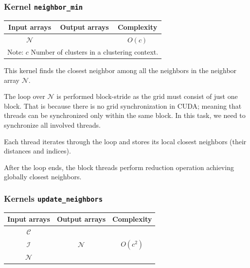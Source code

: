\subsubsection{Kernel \texttt{neighbor\_min}}

\begin{table}[h]
	\centering
	\begin{tabular}{ccc}
		\toprule
		\textbf{Input arrays} & \textbf{Output arrays} & \textbf{Complexity} \\ \midrule
		    $\mathcal{N}$     &                        &       $O(c)$        \\ \bottomrule
	    	\multicolumn{3}{l}{\footnotesize Note: $c$ Number of clusters in a clustering context.}
	\end{tabular}
\end{table}

This kernel finds the closest neighbor among all the neighbors in the neighbor array $\mathcal{N}$.

The loop over $\mathcal{N}$ is performed block-stride as the grid must consist of just one block. That is because there is no grid synchronization in CUDA; meaning that threads can be synchronized only within the same block. In this task, we need to synchronize all involved threads.

Each thread iterates through the loop and stores its local closest neighbors (their distances and indices).

After the loop ends, the block threads perform reduction operation achieving globally closest neighbors.

\subsubsection{Kernels \texttt{update\_neighbors}}

\begin{table}[h]
	\centering
	\begin{tabular}{ccc}
		\toprule
		\textbf{Input arrays} & \textbf{Output arrays} & \textbf{Complexity} \\ \midrule
		$\mathcal{C}$     &                        &                     \\
		$\mathcal{I}$     &     $\mathcal{N}$      &       $O(c^2)$        \\
		$\mathcal{N}$     &                        &                     \\ \bottomrule
	\end{tabular}
\end{table}

